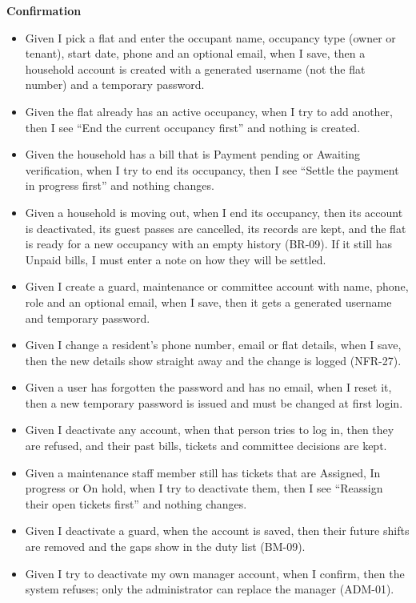 \documentclass[11pt,a4paper]{report}
\begin{document}
\medskip\noindent\textbf{Confirmation}\par

\begin{itemize}
  \item Given I pick a flat and enter the occupant name, occupancy type (owner or tenant), start date, phone and an optional email, when I save, then a household account is created with a generated username (not the flat number) and a temporary password.
  \item Given the flat already has an active occupancy, when I try to add another, then I see ``End the current occupancy first'' and nothing is created.
  \item Given the household has a bill that is Payment pending or Awaiting verification, when I try to end its occupancy, then I see ``Settle the payment in progress first'' and nothing changes.
  \item Given a household is moving out, when I end its occupancy, then its account is deactivated, its guest passes are cancelled, its records are kept, and the flat is ready for a new occupancy with an empty history (BR-09). If it still has Unpaid bills, I must enter a note on how they will be settled.
  \item Given I create a guard, maintenance or committee account with name, phone, role and an optional email, when I save, then it gets a generated username and temporary password.
  \item Given I change a resident's phone number, email or flat details, when I save, then the new details show straight away and the change is logged (NFR-27).
  \item Given a user has forgotten the password and has no email, when I reset it, then a new temporary password is issued and must be changed at first login.
  \item Given I deactivate any account, when that person tries to log in, then they are refused, and their past bills, tickets and committee decisions are kept.
  \item Given a maintenance staff member still has tickets that are Assigned, In progress or On hold, when I try to deactivate them, then I see ``Reassign their open tickets first'' and nothing changes.
  \item Given I deactivate a guard, when the account is saved, then their future shifts are removed and the gaps show in the duty list (BM-09).
  \item Given I try to deactivate my own manager account, when I confirm, then the system refuses; only the administrator can replace the manager (ADM-01).
\end{itemize}
\end{document}
